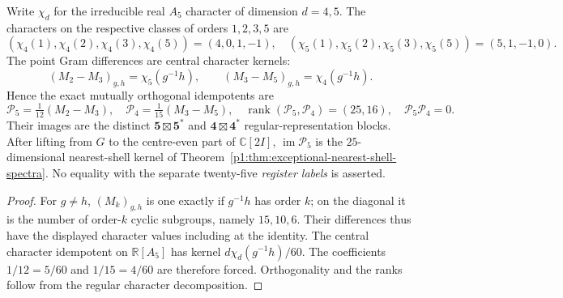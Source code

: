 \documentclass[11pt]{article}
\begin{document}
\begin{theorem}
\label{p1:thm:v340-incidence-character-projectors}
Write $\chi_d$ for the irreducible real $A_5$ character of dimension
$d=4,5$. The characters on the respective classes of orders
$1,2,3,5$ are
\[
 (\chi_4(1),\chi_4(2),\chi_4(3),\chi_4(5))=(4,0,1,-1),
 \quad
 (\chi_5(1),\chi_5(2),\chi_5(3),\chi_5(5))=(5,1,-1,0).
\]
The point Gram differences are central character kernels:
\[
 (M_2-M_3)_{g,h}=\chi_5(g^{-1}h),\qquad
 (M_3-M_5)_{g,h}=\chi_4(g^{-1}h).
\]
Hence the exact mutually orthogonal idempotents are
\[
 \boxed{\mathscr P_5=\tfrac1{12}(M_2-M_3),\quad
 \mathscr P_4=\tfrac1{15}(M_3-M_5)},\quad
 \operatorname{rank}(\mathscr P_5,\mathscr P_4)=(25,16),
 \quad \mathscr P_5\mathscr P_4=0.
\]
Their images are the distinct $\mathbf5\boxtimes\mathbf5^*$ and
$\mathbf4\boxtimes\mathbf4^*$ regular-representation blocks. After
lifting from $G$ to the centre-even part of $\mathbb C[2I]$,
$\operatorname{im}\mathscr P_5$ is the $25$-dimensional nearest-shell
kernel of Theorem~\ref{p1:thm:exceptional-nearest-shell-spectra}.
No equality with the separate twenty-five \emph{register labels} is asserted.
\end{theorem}
\begin{proof}
For $g\ne h$, $(M_k)_{g,h}$ is one exactly if $g^{-1}h$ has
order $k$; on the diagonal it is the number of order-$k$ cyclic
subgroups, namely $15,10,6$. Their differences thus have the displayed
character values including at the identity. The central character
idempotent on $\mathbb R[A_5]$ has kernel
$d\chi_d(g^{-1}h)/60$. The coefficients $1/12=5/60$ and
$1/15=4/60$ are therefore forced. Orthogonality and the ranks
follow from the regular character decomposition.
\end{proof}
\end{document}

